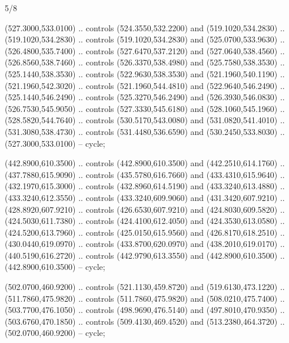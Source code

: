 \begin{flagdescription}{5/8}
\begin{scope}[shift={(m)}]
\begin{scope}[scale=\flagwidth/220,y=0.1mm, x=0.1mm, yscale=-1,shift={(-596,-360)}]
\begin{scope}[cm={{-1.0,0.0,0.0,1.0,(1193.9797,0.0)}}]
\begin{scope}[draw=black,line join=round,line cap=round,line width=0.381\lw]
\begin{scope}[line width=0.534\lw,fill=green]
 (527.3000,533.0100) .. controls (524.3550,532.2200) and
  (519.1020,534.2830) .. (519.1020,534.2830) .. controls (519.1020,534.2830) and
  (525.0700,533.9630) .. (526.4800,535.7400) .. controls (527.6470,537.2120) and
  (527.0640,538.4560) .. (526.8560,538.7460) .. controls (526.3370,538.4980) and
  (525.7580,538.3530) .. (525.1440,538.3530) .. controls (522.9630,538.3530) and
  (521.1960,540.1190) .. (521.1960,542.3020) .. controls (521.1960,544.4810) and
  (522.9640,546.2490) .. (525.1440,546.2490) .. controls (525.3270,546.2490) and
  (526.3930,546.0830) .. (526.7530,545.9050) .. controls (527.3330,545.6180) and
  (528.1060,545.1960) .. (528.5820,544.7640) .. controls (530.5170,543.0080) and
  (531.0820,541.4010) .. (531.3080,538.4730) .. controls (531.4480,536.6590) and
  (530.2450,533.8030) .. (527.3000,533.0100) -- cycle;

 (442.8900,610.3500) .. controls (442.8900,610.3500) and
  (442.2510,614.1760) .. (437.7880,615.9090) .. controls (435.5780,616.7660) and
  (433.4310,615.9640) .. (432.1970,615.3000) .. controls (432.8960,614.5190) and
  (433.3240,613.4880) .. (433.3240,612.3550) .. controls (433.3240,609.9060) and
  (431.3420,607.9210) .. (428.8920,607.9210) .. controls (426.6530,607.9210) and
  (424.8030,609.5820) .. (424.5030,611.7380) .. controls (424.4100,612.4050) and
  (424.3530,613.0580) .. (424.5200,613.7960) .. controls (425.0150,615.9560) and
  (426.8170,618.2510) .. (430.0440,619.0970) .. controls (433.8700,620.0970) and
  (438.2010,619.0170) .. (440.5190,616.2720) .. controls (442.9790,613.3550) and
  (442.8900,610.3500) .. (442.8900,610.3500) -- cycle;

 (502.0700,460.9200) .. controls (521.1130,459.8720) and
  (519.6130,473.1220) .. (511.7860,475.9820) .. controls (511.7860,475.9820) and
  (508.0210,475.7400) .. (503.7700,476.1050) .. controls (498.9690,476.5140) and
  (497.8010,470.9350) .. (503.6760,470.1850) .. controls (509.4130,469.4520) and
  (513.2380,464.3720) .. (502.0700,460.9200) -- cycle;


\end{scope}
\end{scope}
\end{scope}
\end{scope}
\end{scope}
\end{flagdescription}
